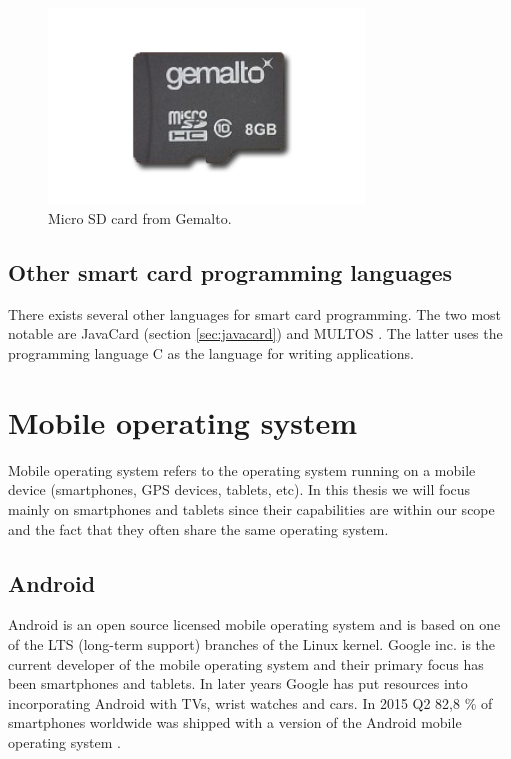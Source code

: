 \begin{figure}[h!]
  \caption{Micro SD card from Gemalto.}
  \label{fig:msdcard}
  \centering
    \includegraphics[width=0.75\textwidth]{images/msd.png}
\end{figure}


\subsection{Other smart card programming languages}
There exists several other languages for smart card programming. The two most notable are JavaCard (section \ref{sec:javacard}) and MULTOS \cite{multos}. The latter uses the programming language C as the language for writing applications.

\section{Mobile operating system}
Mobile operating system refers to the operating system running on a mobile device (smartphones, GPS devices, tablets, etc). In this thesis we will focus mainly on smartphones and tablets since their capabilities are within our scope and the fact that they often share the same operating system.

\subsection{Android}
Android is an open source licensed mobile operating system and is based on one of the LTS (long-term support) branches of the Linux kernel. Google inc. \cite{google} is the current developer of the mobile operating system and their primary focus has been smartphones and tablets. In later years Google has put resources into incorporating Android with TVs, wrist watches and cars. In 2015 Q2 82,8 \% of smartphones worldwide was shipped with a version of the Android mobile operating system \cite{androidMarketShare}.

